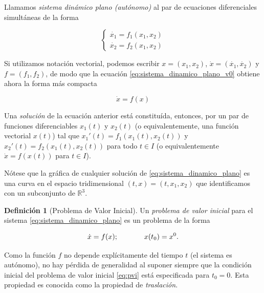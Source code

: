 \documentclass[11pt]{book}
\theoremstyle{definition}
\newtheorem{definition}{Definición}
\numberwithin{definition}{section}
\theoremstyle{theorem}
\numberwithin{theorem}{section}
\numberwithin{lemma}{section}
\numberwithin{corollary}{section}
\theoremstyle{plain}
\numberwithin{example}{section}
\newcommand{\R}{{\ensuremath{\mathbb{R}}}}
\begin{document}
Llamamos \emph{sistema dinámico plano (autónomo)} al par de ecuaciones diferenciales simultáneas de la forma

\begin{equation} \label{eq:sistema_dinamico_plano_v0}
\left\{
    \begin{array}{l}
        \dot{x_1} = f_1(x_1, x_2) \\
        \dot{x_2} = f_2(x_1, x_2)
    \end{array} \right.
\end{equation}

Si utilizamos notación vectorial, podemos escribir $x = (x_1, x_2)$, $\dot{x} = (\dot{x_1}, \dot{x_2})$ y $f = (f_1, f_2)$, de modo que la ecuación \ref{eq:sistema_dinamico_plano_v0} obtiene ahora la forma más compacta

\begin{equation} \label{eq:sistema_dinamico_plano}
    \dot{x} = f(x)
\end{equation}

Una \emph{solución} de la ecuación anterior está constituída, entonces, por un par de funciones diferenciables $x_1(t)$ y $x_2(t)$ (o equivalentemente, una función vectorial $x(t)$) tal que $x_1'(t) = f_1(x_1(t), x_2(t))$ y $x_2'(t) = f_2(x_1(t), x_2(t))$ para todo $t \in I$ (o equivalentemente $\dot{x} = f(x(t))$ para $t \in I$).

Nótese que la gráfica de cualquier solución de \ref{eq:sistema_dinamico_plano} es una curva en el espacio tridimensional $(t,x)=(t,x_1,x_2)$ que identificamos con un subconjunto de $\R^3$.

\begin{definition}[Problema de Valor Inicial]\label{def:pvi}
Un \emph{problema de valor inicial} para el sistema \ref{eq:sistema_dinamico_plano} es un problema de la forma

\begin{equation} \label{eq:pvi}
 \dot{x} = f(x); \hspace{0.5in} x(t_0) = x^0.
\end{equation}

\end{definition}

Como la función $f$ no depende explícitamente del tiempo $t$ (el sistema es autónomo), no hay pérdida de generalidad al suponer siempre que la condición inicial del problema de valor inicial \ref{eq:pvi} está especificada para $t_0 = 0$. Esta propiedad es conocida como la propiedad de \emph{traslación}.
\end{document}
